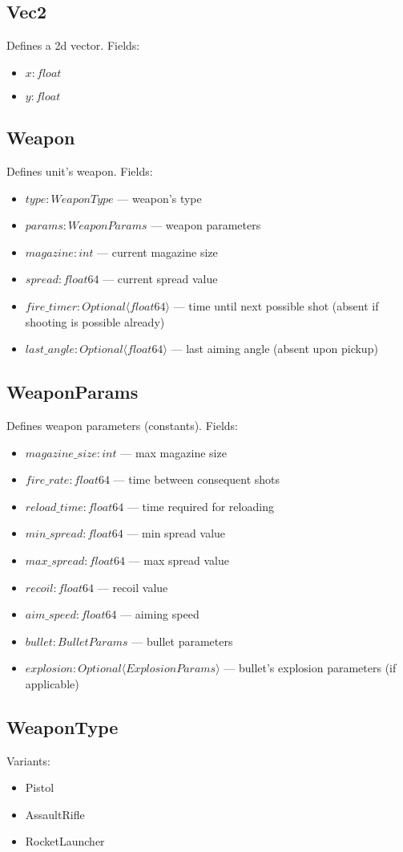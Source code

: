\subsection{Vec2}
Defines a 2d vector. Fields:
\begin{itemize}
    \item $x : float$
    \item $y : float$
\end{itemize}

\subsection{Weapon}
Defines unit's weapon. Fields:
\begin{itemize}
    \item $type : WeaponType$ --- weapon's type
    \item $params : WeaponParams$ --- weapon parameters
    \item $magazine : int$ --- current magazine size
    \item $spread : float64$ --- current spread value
    \item $fire\_timer : Optional \langle float64 \rangle$ --- time until next possible shot (absent if shooting is possible already)
    \item $last\_angle : Optional \langle float64 \rangle$ --- last aiming angle (absent upon pickup)
\end{itemize}

\subsection{WeaponParams}
Defines weapon parameters (constants). Fields:
\begin{itemize}
    \item $magazine\_size : int$ --- max magazine size
    \item $fire\_rate : float64$ --- time between consequent shots
    \item $reload\_time : float64$ --- time required for reloading
    \item $min\_spread : float64$ --- min spread value
    \item $max\_spread : float64$ --- max spread value
    \item $recoil : float64$ --- recoil value
    \item $aim\_speed : float64$ --- aiming speed
    \item $bullet : BulletParams$ --- bullet parameters
    \item $explosion : Optional \langle ExplosionParams \rangle$ --- bullet's explosion parameters (if applicable)
\end{itemize}

\subsection{WeaponType}
Variants:
\begin{itemize}
    \item Pistol
    \item AssaultRifle
    \item RocketLauncher
\end{itemize}